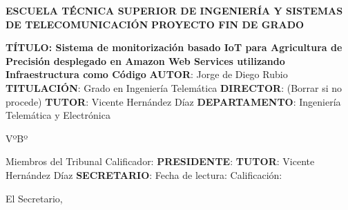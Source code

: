 \documentclass[../../memoria.tex]{subfiles}
\begin{document}
\begin{minipage}[t]{.8\textwidth}
    \bigskip
    \bigskip
    \begin{flushleft}
        \textbf{ESCUELA TÉCNICA SUPERIOR DE INGENIERÍA Y SISTEMAS DE TELECOMUNICACIÓN}
        \bigskip
        \bigskip
        \newline
        \textbf{PROYECTO FIN DE GRADO}
        \bigskip
        \bigskip
        \newline

    \end{flushleft}

    \begin{flushleft}
        \textbf{TÍTULO: Sistema de monitorización basado IoT para Agricultura de Precisión desplegado en Amazon Web Services utilizando Infraestructura como Código}
        \bigskip
        \bigskip
        \bigskip
        \newline
        \textbf{AUTOR}: Jorge de Diego Rubio
        \bigskip
        \newline
        \textbf{TITULACIÓN}:  Grado en Ingeniería Telemática
        \bigskip
        \newline
        \textbf{DIRECTOR}: (Borrar si no procede)
        \bigskip
        \newline
        \textbf{TUTOR}: Vicente Hernández Díaz
        \bigskip
        \newline
        \textbf{DEPARTAMENTO}: Ingeniería Telemática y Electrónica
    \end{flushleft}

    \begin{flushright}
        \bigskip
        VºBº
    \end{flushright}

    \begin{flushleft}
        \bigskip
        Miembros del Tribunal Calificador:
        \bigskip
        \bigskip
        \newline
        \textbf{PRESIDENTE}:
        \bigskip
        \newline
        \textbf{TUTOR}: Vicente Hernández Díaz
        \bigskip
        \newline
        \textbf{SECRETARIO}:
        \bigskip
        \bigskip
        \bigskip
        \newline
        Fecha de lectura:
        \bigskip
        \bigskip
        \bigskip
        \newline
        Calificación:
    \end{flushleft}

    \begin{flushright}
        \bigskip
        \bigskip
        El Secretario,
    \end{flushright}

\end{minipage}
\end{document}
